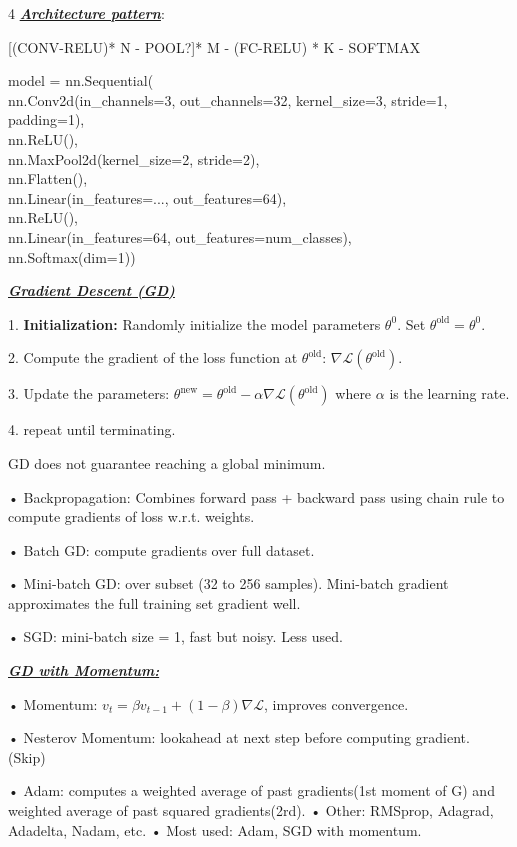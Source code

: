 \documentclass[12pt]{article}
\newcommand{\bulletPoint}[1]{\underline{\textit{\textbf{#1}}}}
\begin{document}
\begin{multicols*}{4}
\bulletPoint{Architecture pattern}:

[(CONV-RELU)* N - POOL?]* M - (FC-RELU) * K - SOFTMAX

\useshortskip
\noindent\begin{minipage}{\linewidth}
{\color{blue}\ttfamily
model = nn.Sequential(\\
    nn.Conv2d(in\_channels=3, out\_channels=32, kernel\_size=3, stride=1, padding=1),\\
    nn.ReLU(),\\
    nn.MaxPool2d(kernel\_size=2, stride=2),\\
    nn.Flatten(),\\
    nn.Linear(in\_features=..., out\_features=64),\\
    nn.ReLU(),\\
    nn.Linear(in\_features=64, out\_features=num\_classes),\\
    nn.Softmax(dim=1))\\
}
\end{minipage}


\bulletPoint{Gradient Descent (GD)} \quad

1. \textbf{Initialization:} Randomly initialize the model parameters $\theta^0$. Set $\theta^{\text{old}} = \theta^0$.

2. Compute the gradient of the loss function at $\theta^{\text{old}}$: $\nabla \mathcal{L}(\theta^{\text{old}})$.

3. Update the parameters:
$\theta^{\text{new}} = \theta^{\text{old}} - \alpha \nabla \mathcal{L}(\theta^{\text{old}})$
where $\alpha$ is the learning rate.

4. repeat until terminating.

GD does not guarantee reaching a global minimum.

• Backpropagation: Combines forward pass + backward pass using chain rule to compute gradients of loss w.r.t. weights. 

• Batch GD: compute gradients over full dataset. 

• Mini-batch GD: over subset (32 to 256 samples). Mini-batch gradient approximates the full training set gradient well.

• SGD: mini-batch size = 1, fast but noisy. Less used. 

\bulletPoint{GD with Momentum:}

• Momentum: $v_t = \beta v_{t-1} + (1-\beta) \nabla \mathcal{L}$, improves convergence. \quad

• Nesterov Momentum: lookahead at next step before computing gradient. (Skip)

• Adam: computes a weighted average of past gradients(1st moment of G) and weighted average of past squared gradients(2rd). 
• Other: RMSprop, Adagrad, Adadelta, Nadam, etc. 
• Most used: Adam, SGD with momentum.





\end{multicols*}
\end{document}
